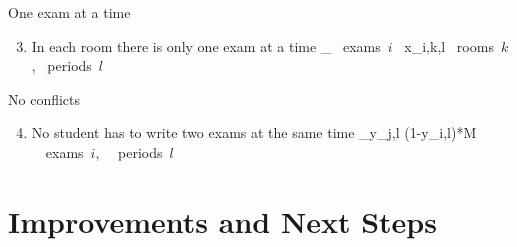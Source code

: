 \documentclass[10pt]{beamer}
\def\ba#1\ea{\begin{align*}#1\end{align*}}
\begin{document}
         \begin{frame}{One exam at a time}
         	\begin{enumerate}
         		\setcounter{enumi}{2}     
         		\item In each room there is only one exam at a time
         		\ba
         		\sum_{ \forall \mbox{\small{ exams $i$ }}} x_{i,k,l}  \;\;\;\;\;\;\;\;\;  \forall \mbox{\small{ rooms $k$}}, \forall \mbox{\small{ periods $l$ }}
         		\ea
         	\end{enumerate}
         \end{frame}
        
        \begin{frame}{No conflicts}
        	\begin{enumerate}
        		\setcounter{enumi}{3}
        		\item No student has to write two exams at the same time
        		\ba
        		\sum_{}y_{j,l}  \leq (1-y_{i,l})*M \;\;\;\ \forall \mbox{\small{ exams $i$, }}  \forall \mbox{\small{ periods $l$ }}
        		\ea
        	\end{enumerate}
        \end{frame}
        
        \section{Improvements and Next Steps}
        
        
        
        
        
        
        
        
        
        
        
\end{document}
